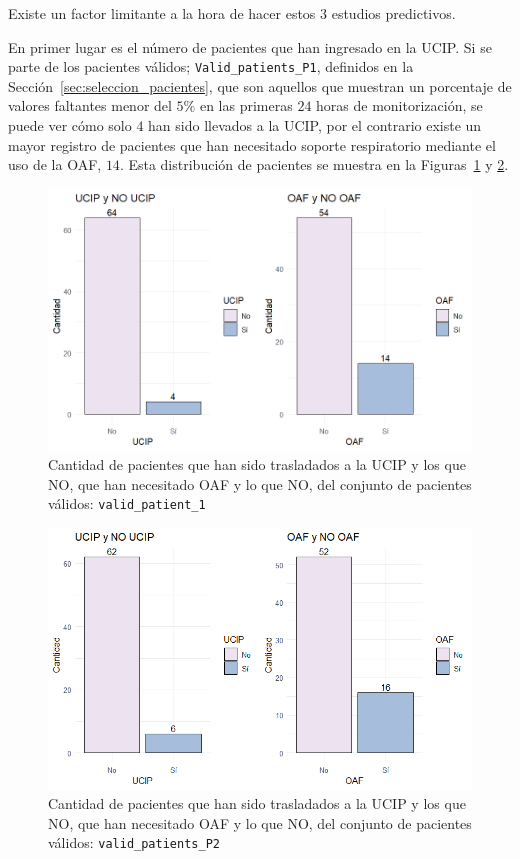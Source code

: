 Existe un factor limitante a la hora de hacer estos $3$ estudios predictivos.

En primer lugar es el número de pacientes que han ingresado en la UCIP. Si se parte de los pacientes válidos; \texttt{Valid\_patients\_P1}, definidos en la Sección~\ref{sec:seleccion_pacientes}, que son aquellos que muestran un porcentaje de valores faltantes menor del $5\%$ en las primeras $24$ horas de monitorización, se puede ver cómo solo $4$ han sido llevados a la UCIP, por el contrario existe un mayor registro de pacientes que han necesitado soporte respiratorio mediante el uso de la OAF, $14$. Esta distribución de pacientes se muestra en la Figuras~\ref{fig:bar-OAF-UCIP-valid-1} y \ref{fig:bar-OAF-UCIP-valid-2}. 

\begin{figure}[H]
    \centering
    \includegraphics[scale = 0.9]{./img/bar-OAF-UCIP-valid-1.png}
    \caption{Cantidad de pacientes que han sido trasladados a la UCIP y los que NO, que han necesitado OAF y lo que NO, del conjunto de pacientes válidos: \texttt{valid\_patient\_1}}
    \label{fig:bar-OAF-UCIP-valid-1}
\end{figure}

\begin{figure}[H]
    \centering
    \includegraphics[scale = 0.9]{./img/bar-OAF-UCIP-valid-2.png}
    \caption{Cantidad de pacientes que han sido trasladados a la UCIP y los que NO, que han necesitado OAF y lo que NO, del conjunto de pacientes válidos: \texttt{valid\_patients\_P2}}
    \label{fig:bar-OAF-UCIP-valid-2}
\end{figure}


